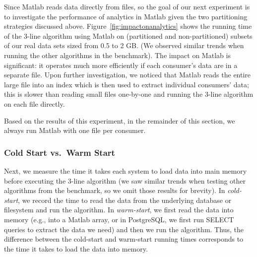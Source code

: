 \documentclass[prodmode,acmtods]{acmsmall}
\begin{document}
Since Matlab reads data directly from files, so the goal of our next experiment is to investigate the performance of analytics in Matlab given the two partitioning strategies discussed above.  Figure~\ref{fig:impactonanalytics} shows the running time of the 3-line algorithm using Matlab on (partitioned and non-partitioned) subsets of our real data sets sized from 0.5 to 2 GB.  (We observed similar trends when running the other algorithms in the benchmark).  The impact on Matlab is significant: it operates much more efficiently if each consumer's data are in a separate file.  Upon further investigation, we noticed that Matlab reads the entire large file into an index which is then used to extract individual consumers' data; this is slower than reading small files one-by-one and running the 3-line algorithm on each file directly.  

\begin{figure*}[t]
\centering
\begin{minipage}[b]{0.49\linewidth}
\centering
{}
\vspace{18pt}
\caption{Data loading times, \newline 10GB real dataset.}
\label{fig:impactonload}
\end{minipage}
\begin{minipage}[b]{0.49\linewidth}
\centering
{}
\caption{Impact of data partitioning on analytics, 3-line algorithm.}
\label{fig:impactonanalytics}
\end{minipage}
\end{figure*}

Based on the results of this experiment, in the remainder of this section, we always run Matlab with one file per consumer.  

\subsubsection{Cold Start vs.\ Warm Start}
\label{exp:coldwarm}

Next, we measure the time it takes each system to load data into main memory before executing the 3-line algorithm (we saw similar trends when testing other algorithms from the benchmark, so we omit those results for brevity).  In \emph{cold-start}, we record the time to read the data from the underlying database or filesystem and run the algorithm.  In \emph{warm-start}, we first read the data into memory (e.g., into a Matlab array, or in PostgreSQL, we first run SELECT queries to extract the data we need) and then we run the algorithm.  Thus, the difference between the cold-start and warm-start running times corresponds to the time it takes to load the data into memory.  
\end{document}
